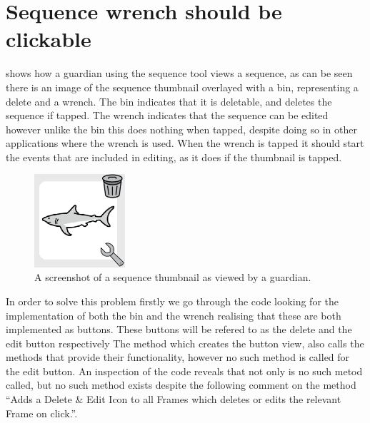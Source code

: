 \section{Sequence wrench should be clickable}
 shows how a guardian using the sequence tool views a sequence, as can be seen there is an image of the sequence thumbnail overlayed with a bin, representing a delete and a wrench.
The bin indicates that it is deletable, and deletes the sequence if tapped.
The wrench indicates that the sequence can be edited however unlike the bin this does nothing when tapped, despite doing so in other applications where the wrench is used.
When the wrench is tapped it should start the events that are included in editing, as it does if the thumbnail is tapped.
\begin{figure}
    \centering
    \includegraphics[width=0.3\textwidth]{figures/img/screenshots/sequence_pictogram.png} 
    \caption{A screenshot of a sequence thumbnail as viewed by a guardian.}
    \label{fig:seq_wrench} 
    \vspace{10pt}
\end{figure}
\bigskip
\noindent
In order to solve this problem firstly we go through the code looking for the implementation of both the bin and the wrench realising that these are both implemented as buttons.
These buttons will be refered to as the delete and the edit button respectively
The method which creates the button view, also calls the methods that provide their functionality, however no such method is called for the edit button.
An inspection of the code reveals that not only is no such metod called, but no such method exists despite the following comment on the method ``\/\/Adds a Delete \& Edit Icon to all Frames which deletes or edits the relevant Frame on click.''.